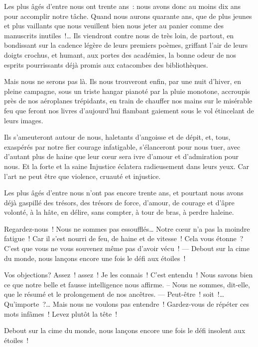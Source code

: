 \documentclass[french,twoside]{book} %
\newcommand{\signed}[1]{\bigbreak\filbreak{\raggedleft #1\par}\medskip}
\begin{document}
Les plus âgés d’entre nous ont trente ans : nous avons donc au moins dix ans pour accomplir notre tâche. Quand nous aurons quarante ans, que de plus jeunes et plus vaillants que nous veuillent bien nous jeter au panier comme des manuscrits inutiles !… Ils viendront contre nous de très loin, de partout, en bondissant sur la cadence légère de leurs premiers poèmes, griffant l’air de leurs doigts crochus, et humant, aux portes des académies, la bonne odeur de nos esprits pourrissants déjà promis aux catacombes des bibliothèques.\par
Mais nous ne serons pas là. Ils nous trouveront enfin, par une nuit d’hiver, en pleine campagne, sous un triste hangar pianoté par la pluie monotone, accroupis près de nos aéroplanes trépidants, en train de chauffer nos mains sur le misérable feu que feront nos livres d’aujourd’hui flambant gaiement sous le vol étincelant de leurs images.\par
Ils s’ameuteront autour de nous, haletants d’angoisse et de dépit, et, tous, exaspérés par notre fier courage infatigable, s’élanceront pour nous tuer, avec d’autant plus de haine que leur cœur sera ivre d’amour et d’admiration pour nous. Et la forte et la saine Injustice éclatera radieusement dans leurs yeux. Car l’art ne peut être que violence, cruauté et injustice.\par
Les plus âgés d’entre nous n’ont pas encore trente ans, et pourtant nous avons déjà gaspillé des trésors, des trésors de force, d’amour, de courage et d’âpre volonté, à la hâte, en délire, sans compter, à tour de bras, à perdre haleine.\par
Regardez-nous ! Nous ne sommes pas essoufflés… Notre cœur n’a pas la moindre fatigue ! Car il s’est nourri de feu, de haine et de vitesse ! Cela vous étonne ? C’est que vous ne vous souvenez même pas d’avoir vécu ! — Debout sur la cime du monde, nous lançons encore une fois le défi aux étoiles !\par
Vos objections? Assez ! assez ! Je les connais ! C’est entendu ! Nous savons bien ce que notre belle et fausse intelligence nous affirme. – Nous ne sommes, dit-elle, que le résumé et le prolongement de nos ancêtres. — Peut-être ! soit !… Qu’importe ?… Mais nous ne voulons pas entendre ! Gardez-vous de répéter ces mots infâmes ! Levez plutôt la tête !\par
Debout sur la cime du monde, nous lançons encore une fois le défi insolent aux étoiles !\par


\signed{F.-T. Marinetti.}
 
\end{document}
